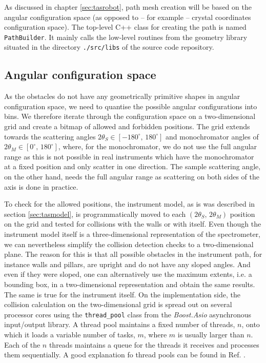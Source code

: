 As discussed in chapter \ref{sec:tasrobot}, path mesh creation will be based on the angular configuration space
(as opposed to -- for example -- crystal coordinates configuration space). 
The top-level C++ class for creating the path is named \lstinline[language=C++]|PathBuilder|. 
It mainly calls the low-level routines from the geometry library situated in the directory \lstinline|./src/libs| 
of the source code repository.


\subsection{Angular configuration space}
\label{sec:angular_config_space}
As the obstacles do not have any geometrically primitive shapes in angular configuration space, we need to quantise
the possible angular configurations into bins. We therefore iterate through the configuration space on a two-dimensional 
grid and create a bitmap of allowed and forbidden positions. The grid extends towards the scattering angles 
$2\theta_S \in \left[ -180^{\circ},\, 180^{\circ} \right]$ and monochromator angles of 
$2\theta_M \in \left[0^{\circ},\, 180^{\circ} \right]$, where, for the monochromator, we do
not use the full angular range as this is not possible in real instruments which have the monochromator at a 
fixed position and only scatter in one direction. The sample scattering angle, on the other hand, needs the full 
angular range as scattering on both sides of the axis is done in practice.

To check for the allowed positions, the instrument model, as is was described in section \ref{sec:tasmodel}, is
programmatically moved to each $\left( 2\theta_S,\, 2\theta_M \right)$ position on the grid and tested for
collisions with the walls or with itself.
Even though the instrument model itself is a three-dimensional representation of the spectrometer, we
can nevertheless simplify the collision detection checks to a two-dimensional plane. The reason for this is
that all possible obstacles in the instrument path, for instance walls and pillars, are upright and do not have
any sloped angles. And even if they were sloped, one can alternatively use the maximum extents, i.e. a bounding box,
in a two-dimensional representation and obtain the same results. The same is true for the instrument itself.
On the implementation side, the collision calculation on the two-dimensional grid is spread out on several
processor cores using the \lstinline[language=C++]|thread_pool| \cite{web_boost_asio_threadpool} class from the
\textit{Boost.Asio} \cite{web_boost_asio} asynchronous input/output library.
A thread pool maintains a fixed number of threads, $n$, onto which it loads a variable number
of tasks, $m$, where $m$ is usually larger than $n$. Each of the $n$ threads maintains a queue for the
threads it receives and processes them sequentially. A good explanation fo thread pools can be 
found in Ref. \cite[pp. 273-299]{Williams2012}.

